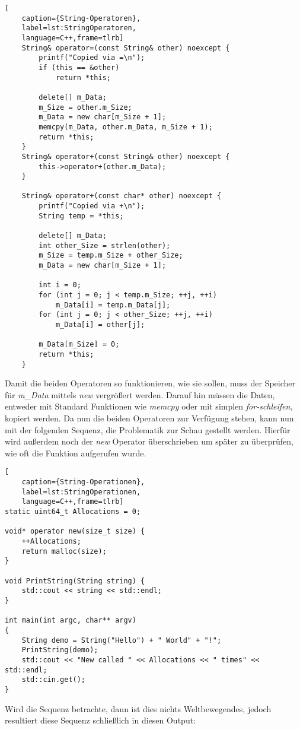 \begin{lstlisting}[
    caption={String-Operatoren},
    label=lst:StringOperatoren,
    language=C++,frame=tlrb]
	String& operator=(const String& other) noexcept {
		printf("Copied via =\n");
		if (this == &other)
			return *this;

		delete[] m_Data;
		m_Size = other.m_Size;
		m_Data = new char[m_Size + 1];
		memcpy(m_Data, other.m_Data, m_Size + 1);
		return *this;
	}
	String& operator+(const String& other) noexcept {
		this->operator+(other.m_Data);
	}

	String& operator+(const char* other) noexcept {
		printf("Copied via +\n");
		String temp = *this;

		delete[] m_Data;
		int other_Size = strlen(other);
		m_Size = temp.m_Size + other_Size;
		m_Data = new char[m_Size + 1];

		int i = 0;
		for (int j = 0; j < temp.m_Size; ++j, ++i)
			m_Data[i] = temp.m_Data[j];
		for (int j = 0; j < other_Size; ++j, ++i)
			m_Data[i] = other[j];

		m_Data[m_Size] = 0;
		return *this;
	}
\end{lstlisting}

Damit die beiden Operatoren so funktionieren, wie sie sollen, muss der Speicher für \emph{m\_Data}
mittels \emph{new} vergrößert werden. Darauf hin müssen die Daten, entweder mit Standard Funktionen
wie \emph{memcpy} oder mit simplen \emph{for-schleifen}, kopiert werden.
\newline
\newline
Da nun die beiden Operatoren zur Verfügung stehen, kann nun mit der folgenden Sequenz, die
Problematik zur Schau gestellt werden. Hierfür wird außerdem noch der \emph{new} Operator
überschrieben um später zu überprüfen, wie oft die Funktion aufgerufen wurde.

\begin{lstlisting}[
    caption={String-Operationen},
    label=lst:StringOperationen,
    language=C++,frame=tlrb]
static uint64_t Allocations = 0;

void* operator new(size_t size) {
	++Allocations;
	return malloc(size);
}

void PrintString(String string) {
	std::cout << string << std::endl;
}

int main(int argc, char** argv)
{
	String demo = String("Hello") + " World" + "!";
	PrintString(demo);
	std::cout << "New called " << Allocations << " times" << std::endl;
	std::cin.get();
}
\end{lstlisting}
Wird die Sequenz betrachte, dann ist dies nichts Weltbewegendes, jedoch resultiert diese Sequenz
schließlich in diesen Output:

